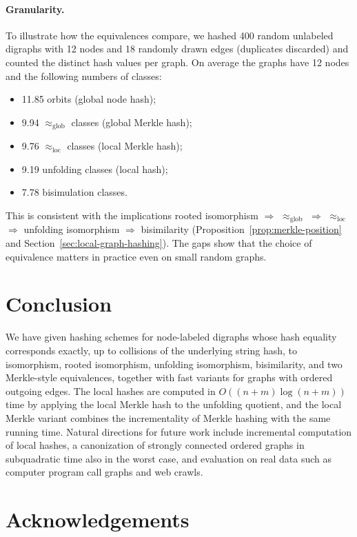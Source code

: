\documentclass[twoside,leqno]{article}
\newcommand{\eqg}{\approx_{\mathrm{glob}}}
\newcommand{\eql}{\approx_{\mathrm{loc}}}
\begin{document}
\paragraph{Granularity.} To illustrate how the equivalences compare, we hashed 400 random unlabeled digraphs with 12 nodes and 18 randomly drawn edges (duplicates discarded) and counted the distinct hash values per graph. On average the graphs have 12 nodes and the following numbers of classes:
\begin{itemize}
  \item 11.85 orbits (global node hash);
  \item 9.94 $\eqg$ classes (global Merkle hash);
  \item 9.76 $\eql$ classes (local Merkle hash);
  \item 9.19 unfolding classes (local hash);
  \item 7.78 bisimulation classes.
\end{itemize}
This is consistent with the implications rooted isomorphism $\Rightarrow$ $\eqg$ $\Rightarrow$ $\eql$ $\Rightarrow$ unfolding isomorphism $\Rightarrow$ bisimilarity (Proposition~\ref{prop:merkle-position} and Section~\ref{sec:local-graph-hashing}). The gaps show that the choice of equivalence matters in practice even on small random graphs.

\section{Conclusion}
\label{sec:conclusion}

We have given hashing schemes for node-labeled digraphs whose hash equality corresponds exactly, up to collisions of the underlying string hash, to isomorphism, rooted isomorphism, unfolding isomorphism, bisimilarity, and two Merkle-style equivalences, together with fast variants for graphs with ordered outgoing edges. The local hashes are computed in $O((n+m)\log(n+m))$ time by applying the local Merkle hash to the unfolding quotient, and the local Merkle variant combines the incrementality of Merkle hashing with the same running time. Natural directions for future work include incremental computation of local hashes, a canonization of strongly connected ordered graphs in subquadratic time also in the worst case, and evaluation on real data such as computer program call graphs and web crawls.

\section*{Acknowledgements}
\end{document}
